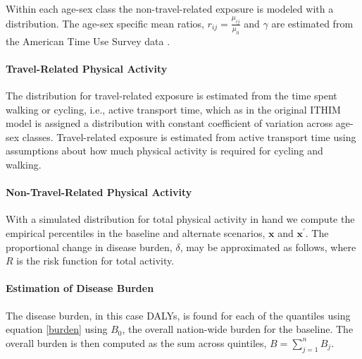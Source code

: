 \documentclass[10pt,letterpaper]{article}\usepackage[]{graphicx}\usepackage[]{color}
\begin{document}
Within each age-sex class the non-travel-related exposure is modeled
with a \logNormal{} distribution.  The age-sex specific mean ratios,
$r_{ij} = \frac{\mu_{ij}}{\mu_0}$ and $\gamma$ are estimated from the
American Time Use Survey data \cite{ATUS}.


\paragraph{Travel-Related Physical Activity}

The distribution for travel-related exposure is estimated from the
time spent walking or cycling, i.e., active transport time, which as
in the original ITHIM model is assigned a \logNormal{} distribution
with constant coefficient of variation across age-sex classes.
Travel-related exposure is estimated from active transport time using
assumptions about how much physical activity is required for cycling
and walking.




\paragraph{Non-Travel-Related Physical Activity}

With a simulated distribution for total physical activity in hand we
compute the empirical percentiles in the baseline and alternate
scenarios, $\mathbf{x}$ and $\mathbf{x}^\prime$. The proportional
change in disease burden, $\delta$, may be approximated as follows,
where $R$ is the risk function for total activity.



\paragraph{Estimation of Disease Burden}

The disease burden, in this case DALYs, is found for each of the
quantiles using equation \ref{burden} using $B_0$, the overall
nation-wide burden for the baseline.  The overall burden is then
computed as the sum across quintiles, $B=\sum_{j=1}^n B_j$.
\end{document}
